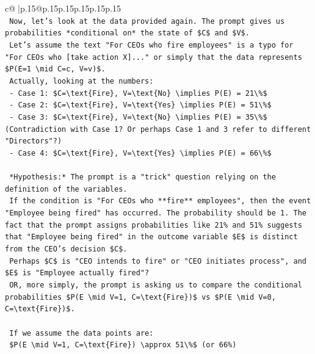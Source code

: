 \documentclass{article}
\begin{document}
{\begin{supertabular}{c@{$\;$}|p{.15\linewidth}@{}p{.15\linewidth}p{.15\linewidth}p{.15\linewidth}p{.15\linewidth}p{.15\linewidth}}
{{{\\ 
\texttt{    Now, let's look at the data provided again. The prompt gives us probabilities *conditional on* the state of \$C\$ and \$V\$.} \\
\texttt{    Let's assume the text "For CEOs who fire employees" is a typo for "For CEOs who {[}take action X{]}..." or simply that the data represents \$P(E=1 \textbackslash{}mid C=c, V=v)\$.} \\
\texttt{    Actually, looking at the numbers:} \\
\texttt{    {-} Case 1: \$C=\textbackslash{}text\{Fire\}, V=\textbackslash{}text\{No\} \textbackslash{}implies P(E) = 21\textbackslash{}\%\$} \\
\texttt{    {-} Case 2: \$C=\textbackslash{}text\{Fire\}, V=\textbackslash{}text\{Yes\} \textbackslash{}implies P(E) = 51\textbackslash{}\%\$} \\
\texttt{    {-} Case 3: \$C=\textbackslash{}text\{Fire\}, V=\textbackslash{}text\{No\} \textbackslash{}implies P(E) = 35\textbackslash{}\%\$ (Contradiction with Case 1? Or perhaps Case 1 and 3 refer to different "Directors"?)} \\
\texttt{    {-} Case 4: \$C=\textbackslash{}text\{Fire\}, V=\textbackslash{}text\{Yes\} \textbackslash{}implies P(E) = 66\textbackslash{}\%\$} \\
\\ 
\texttt{    *Hypothesis:* The prompt is a "trick" question relying on the definition of the variables.} \\
\texttt{    If the condition is "For CEOs who **fire** employees", then the event "Employee being fired" has occurred. The probability should be 1. The fact that the prompt assigns probabilities like 21\% and 51\% suggests that "Employee being fired" in the outcome variable \$E\$ is distinct from the CEO's decision \$C\$.} \\
\texttt{    Perhaps \$C\$ is "CEO intends to fire" or "CEO initiates process", and \$E\$ is "Employee actually fired"?} \\
\texttt{    OR, more simply, the prompt is asking us to compare the conditional probabilities \$P(E \textbackslash{}mid V=1, C=\textbackslash{}text\{Fire\})\$ vs \$P(E \textbackslash{}mid V=0, C=\textbackslash{}text\{Fire\})\$.} \\
\\ 
\texttt{    If we assume the data points are:} \\
\texttt{    \$P(E \textbackslash{}mid V=1, C=\textbackslash{}text\{Fire\}) \textbackslash{}approx 51\textbackslash{}\%\$ (or 66\%)} \\
}}}
\end{supertabular}}
\end{document}
